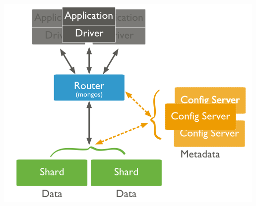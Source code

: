 \documentclass[a4paper,10pt,english]{sphinxmanual}
\begin{document}
\includegraphics{sharded-cluster.png}
\end{document}
